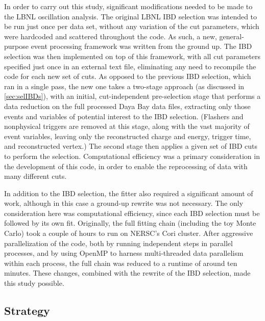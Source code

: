 \documentclass[../thesis.tex]{subfiles}
\begin{document}
In order to carry out this study, significant modifications needed to be made to the LBNL oscillation analysis. The original LBNL IBD selection was intended to be run just once per data set, without any variation of the cut parameters, which were hardcoded and scattered throughout the code. As such, a new, general-purpose event processing framework was written from the ground up. The IBD selection was then implemented on top of this framework, with all cut parameters specified just once in an external text file, eliminating any need to recompile the code for each new set of cuts. As opposed to the previous IBD selection, which ran in a single pass, the new one takes a two-stage approach (as discussed in \autoref{sec:selIBDs}), with an initial, cut-independent pre-selection stage that performs a data reduction on the full processed Daya Bay data files, extracting only those events and variables of potential interest to the IBD selection. (Flashers and nonphysical triggers are removed at this stage, along with the vast majority of event variables, leaving only the reconstructed charge and energy, trigger time, and reconstructed vertex.) The second stage then applies a given set of IBD cuts to perform the selection. Computational efficiency was a primary consideration in the development of this code, in order to enable the reprocessing of data with many different cuts.

In addition to the IBD selection, the fitter also required a significant amount of work, although in this case a ground-up rewrite was not necessary. The only consideration here was computational efficiency, since each IBD selection must be followed by its own fit. Originally, the full fitting chain (including the toy Monte Carlo) took a couple of hours to run on NERSC's Cori cluster. After aggressive parallelization of the code, both by running independent steps in parallel processes, and by using OpenMP to harness multi-threaded data parallelism within each process, the full chain was reduced to a runtime of around ten minutes. These changes, combined with the rewrite of the IBD selection, made this study possible.

\subsection{Strategy}
\label{sec:cutVaryStrategy}
\end{document}
